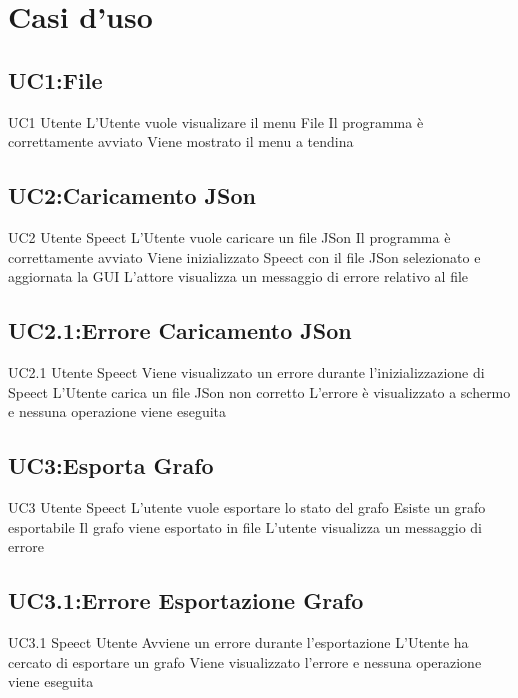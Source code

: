 \documentclass[../AnalisideiRequisiti.tex]{subfiles}
\begin{document}
	\chapter{Casi d'uso}
	\section{UC1:File}
	\UserCase
	{UC1}
	{Utente}
	{}
	{L'Utente vuole visualizare il menu File}
	{Il programma è correttamente avviato}
	{Viene mostrato il menu a tendina}
	{}
	{}
	\section{UC2:Caricamento JSon}
	\UserCase
	{UC2}
	{Utente}
	{Speect}
	{L'Utente vuole caricare un file JSon}
	{Il programma è correttamente avviato}
	{Viene inizializzato Speect con il file JSon selezionato e aggiornata la GUI}
	{L'attore visualizza un messaggio di errore relativo al file }
	{}
	\section{UC2.1:Errore Caricamento JSon}
	\UserCase
	{UC2.1}
	{Utente}
	{Speect}
	{Viene visualizzato un errore durante l'inizializzazione di Speect}
	{L'Utente carica un file JSon non corretto}
	{L'errore è visualizzato a schermo e nessuna operazione viene eseguita}
	{}
	{}
	\section{UC3:Esporta Grafo}
	\UserCase
	{UC3}
	{Utente}
	{Speect}
	{L'utente vuole esportare lo stato del grafo}
	{Esiste un grafo esportabile}
	{Il grafo viene esportato in file}
	{ L'utente visualizza un messaggio di errore }
	{}
\section{UC3.1:Errore Esportazione Grafo}
\UserCase
{UC3.1}
{Speect}
{Utente}
{Avviene un errore durante l'esportazione}
{L'Utente ha cercato di esportare un grafo}
{Viene visualizzato l'errore e nessuna operazione viene eseguita}
{}
{}
\end{document}
